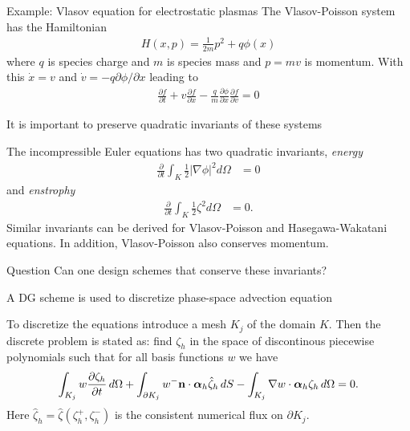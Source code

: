\documentclass[pdf]{beamer}
\newcommand{\pfrac}[2]{\frac{\partial #1}{\partial #2}}
\newcommand{\pfraca}[1]{\frac{\partial}{\partial #1}}
\newcommand{\mvec}[1]{\mathbf{#1}}
\newcommand{\gvec}[1]{\boldsymbol{#1}}
\newcommand{\mypause}{}
\theoremstyle{definition}
\begin{document}
\begin{frame}{Example: Vlasov equation for electrostatic plasmas}%
  The Vlasov-Poisson system has the Hamiltonian
  \begin{align*}
    H(x,p) = \frac{1}{2m}p^2 + q\phi(x)
  \end{align*}
  where $q$ is species charge and $m$ is species mass and $p=mv$ is
  momentum. With this $\dot{x} = v$ and $\dot{v} =
  -q\partial\phi/\partial x$ leading to
  \begin{align*}
    \pfrac{f}{t} + v\pfrac{f}{x} -
    \frac{q}{m}\pfrac{\phi}{x}\pfrac{f}{v} = 0
  \end{align*}
\end{frame}

\begin{frame}{It is important to preserve quadratic invariants of
    these systems}%

  The incompressible Euler equations has two quadratic invariants,
  \emph{energy}
  \begin{align*}
    \pfraca{t}\int_K \frac{1}{2} |\nabla\phi|^2  d\Omega &= 0
  \end{align*}
  and \emph{enstrophy}
  \begin{align*}
    \pfraca{t}\int_K \frac{1}{2}\zeta^2 d\Omega &= 0.
  \end{align*}
  Similar invariants can be derived for Vlasov-Poisson and
  Hasegawa-Wakatani equations.  In addition, Vlasov-Poisson also
  conserves momentum.
  \mypause
  \begin{block}{Question}
    Can one design schemes that conserve these invariants?
  \end{block}

\end{frame}

\begin{frame}{A DG scheme is used to discretize phase-space advection
    equation}

  To discretize the equations introduce a mesh $K_j$ of the domain
  $K$. Then the discrete problem is stated as: find $\zeta_h$ in the
  space of discontinous piecewise polynomials such that for all basis
  functions $w$ we have
  \begin{align*}
    \int_{K_j} w \pfrac{\zeta_h}{t}\thinspace d\Omega 
    +
    \int_{\partial K_j}w^- \mvec{n}\cdot\gvec{\alpha}_h\hat{\zeta}_h\thinspace dS
    -
    \int_{K_j} \nabla w\cdot\gvec{\alpha}_h \zeta_h\thinspace d\Omega = 0.
  \end{align*}
  Here $\hat{\zeta}_h = \hat{\zeta}(\zeta^+_h,\zeta^-_h)$ is the
  consistent numerical flux on $\partial K_j$.
\end{frame}
\end{document}
